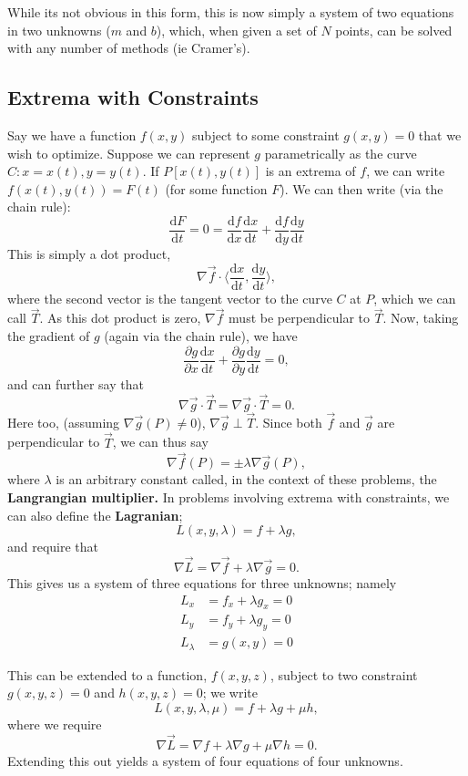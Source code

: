 \documentclass[12pt]{article}
\begin{document}
{While its not obvious in this form, this is now simply a system of two equations in two unknowns ($m$ and $b$), which, when given a set of $N$ points, can be solved with any number of methods (ie Cramer's).

\subsection{Extrema with Constraints}

Say we have a function $f(x,y)$ subject to some constraint $g(x,y) = 0$ that we wish to optimize. Suppose we can represent $g$ parametrically as the curve $C: x = x(t), y = y(t)$. If $P[x(t), y(t)]$ is an extrema of $f$, we can write $f(x(t), y(t)) = F(t)$ (for some function $F$). We can then write (via the chain rule): \[\frac{\text{d}F}{\text{d}t} = 0 = \frac{\text{d}f}{\text{d}x} \frac{\text{d}x}{\text{d}t} + \frac{\text{d}f}{\text{d}y}\frac{\text{d}y}{\text{d}t}\] This is simply a dot product, \[\nabla \vec{f} \cdot \langle \frac{\text{d}x}{\text{d}t}, \frac{\text{d}y}{\text{d}t} \rangle, \] where the second vector is the tangent vector to the curve $C$ at $P$, which we can call $\vec{T}$. As this dot product is zero, $\nabla \vec{f}$ must be perpendicular to $\vec{T}$. Now, taking the gradient of $g$ (again via the chain rule), we have \[\frac{\partial g}{\partial x} \frac{\text{d}x}{\text{d}t} + \frac{\partial g}{\partial y} \frac{\text{d}y}{\text{d}t} = 0,\] and can further say that \[\nabla \vec{g} \cdot \vec{T}= \nabla \vec{g} \cdot \vec{T} = 0 .\] Here too, (assuming $\nabla \vec{g}(P) \neq 0$), $\nabla \vec{g} \perp \vec{T}$. Since both $\vec{f}$ and $\vec{g}$ are perpendicular to $\vec{T}$, we can thus say \[\nabla \vec{f}(P) = \pm \lambda \nabla \vec{g}(P),\] where $\lambda$ is an arbitrary constant called, in the context of these problems, the \textbf{Langrangian multiplier.} In problems involving extrema with constraints, we can also define the \textbf{Lagranian}; \[L(x,y, \lambda) = f + \lambda g,\] and require that \[\nabla \vec{L} = \nabla \vec{f}  + \lambda \nabla \vec{g} = 0.\] This gives us a system of three equations for three unknowns; namely \begin{align*}
    L_x &= f_x + \lambda g_x = 0\\
    L_y &= f_y + \lambda g_y = 0\\
    L_{\lambda} &= g(x,y) = 0
\end{align*}

This can be extended to a function, $f(x,y,z)$, subject to two constraint $g(x,y,z) = 0$ and $h(x,y,z) = 0$; we write \[L(x,y,\lambda, \mu) = f + \lambda g + \mu h,\] where we require \[\nabla \vec{L} = \nabla f + \lambda \nabla g + \mu \nabla h = 0.\] Extending this out yields a system of four equations of four unknowns.

}
\end{document}
